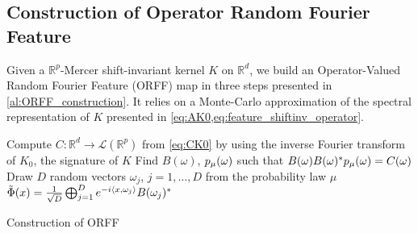 \documentclass[twocolumn]{article}
\begin{document}
\subsection{Construction of Operator Random Fourier Feature}
Given a $\mathbb{R}^p$-Mercer shift-invariant kernel $K$ on $\mathbb{R}^d$, we
build an Operator-Valued Random Fourier Feature (ORFF) map in three steps
presented in \cref{al:ORFF_construction}. It relies on a Monte-Carlo
approximation of the spectral representation of $K$ presented in
\cref{eq:AK0,eq:feature_shiftinv_operator}.
\begin{center}
    \begin{algorithm2e}[tb]
        \SetAlgoLined
        \BlankLine
        Compute $C:\mathbb{R}^d \rightarrow \mathcal{L}(\mathbb{R}^p)$ from
        \cref{eq:CK0} by using the inverse Fourier transform of $K_0$, the
        signature of $K$\; Find $B(\omega)$, $p_{\mu}(\omega)$ such that
        $B(\omega)B(\omega)^*p_{\mu}(\omega)=C(\omega)$\;
        Draw $D$ random vectors $\omega_j$, $j=1, \hdots, D$ from the
        probability law $\mu$\;
        \Return $\tilde{\Phi}(x) = \frac{1}{\sqrt{D}} \operatorname*{\bigoplus}_{j=1}^D
        e^{-i\langle x,\omega_j\rangle} B(\omega_j)^*$\;
        \caption{Construction of ORFF}
        \label{al:ORFF_construction}
    \end{algorithm2e}
\end{center}
\end{document}
